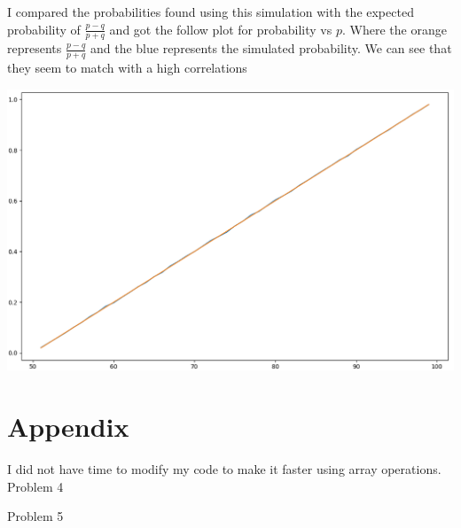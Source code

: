 \documentclass[12pt]{amsart}
\theoremstyle{definition}
\begin{document}
\begin{itemize}
\begin{enumerate}[label=(\alph*)]
I compared the probabilities found using this simulation with the expected probability of $\frac{p-q}{p+q}$ and got the follow plot for probability vs $p$. Where the orange represents $\frac{p-q}{p+q}$ and the blue represents the simulated probability. We can see that they seem to match with a high correlations

\includegraphics[scale=.55]{prob_thing_rwhw2p5.png}
    
\end{enumerate}

\newpage
\section*{Appendix}
%
I did not have time to modify my code to make it faster using array operations.\\
Problem 4

Problem 5









\end{itemize}
\end{document}
